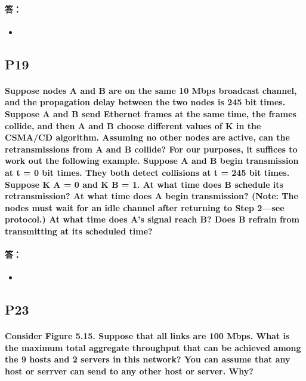 \documentclass[a4paper]{ctexart}
\begin{document}
\paragraph*{答：} 
\begin{itemize}
    \item 
\end{itemize}

\subsection*{P19}
\paragraph*{Suppose nodes A and B are on the same 10 Mbps broadcast channel, and the propagation delay between the two nodes is 245 bit times. Suppose A and B send Ethernet frames at the same time, the frames collide, and then A and B choose different values of K in the CSMA/CD algorithm. Assuming no other nodes are active, can the retransmissions from A and B collide? For our purposes, it suffices to work out the following example. Suppose A and B begin transmission at t = 0 bit times. They both detect collisions at t = 245 bit times. Suppose K A = 0 and K B = 1. At what time does B schedule its retransmission? At what time does A begin transmission? (Note: The nodes must wait for an idle channel after returning to Step 2—see protocol.) At what time does A’s signal reach B? Does B refrain from transmitting at its scheduled time?\\}
\paragraph*{答：} 
\begin{itemize}
    \item 
\end{itemize}

\subsection*{P23}
\paragraph*{Consider Figure 5.15. Suppose that all links are 100 Mbps. What is the maximum total aggregate throughput that can be achieved among the 9 hosts and 2 servers in this network? You can assume that any host or serrver can send to any other host or server. Why?\\}
\end{document}
